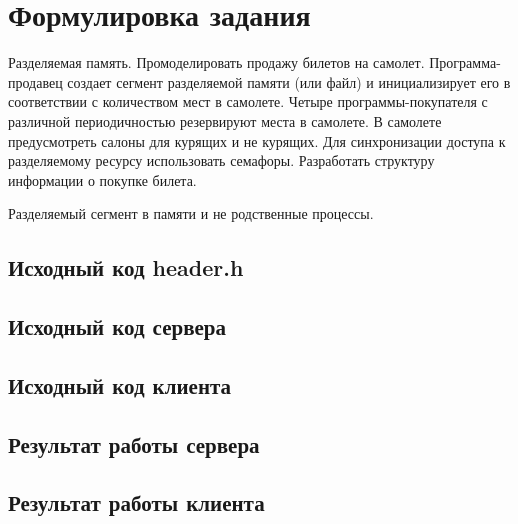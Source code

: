 \documentclass[a4paper,14pt]{article}
\begin{document}


\tableofcontents
\pagebreak

\section{Формулировка задания}
Разделяемая память. 
Промоделировать продажу билетов на самолет. 
Программа-продавец создает сегмент разделяемой памяти (или файл) и инициализирует его в соответствии с количеством мест в самолете. 
Четыре программы-покупателя с различной периодичностью резервируют места в самолете. 
В самолете предусмотреть салоны для курящих и не курящих. 
Для синхронизации доступа к разделяемому ресурсу использовать семафоры. 
Разработать структуру информации о покупке билета.

Разделяемый сегмент в памяти и не родственные процессы.

\subsection{Исходный код header.h}
{\footnotesize }
\subsection{Исходный код сервера}
{\footnotesize }
\subsection{Исходный код клиента}
{\footnotesize }
\subsection{Результат работы сервера}
{\footnotesize }
\subsection{Результат работы клиента}
{\footnotesize }
\end{document}
